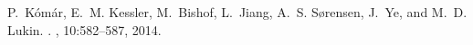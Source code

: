 {\begin{thebibliography}{1}
P.~K\'{o}m\'{a}r, 
E.~M. Kessler, 
M.~Bishof, 
L.~Jiang, 
A.~S. S{\o}rensen, 
J.~Ye,
and M.~D. Lukin.
.
, 
10:582--587, 2014.




\end{thebibliography}
}